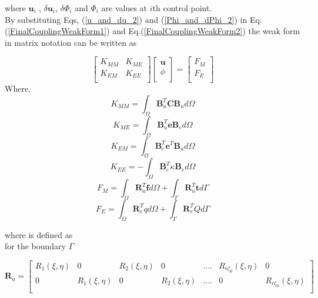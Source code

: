 \documentclass[12pt]{article}
\begin{document}
\noindent
where $\textbf{u}_i$ , $\delta\textbf{u}_i$, $\delta\Phi_i$ and $\Phi_i$ are values at $i$th control point.\\
By substituting Eqs, (\ref{u_and_du_2}) and (\ref{Phi_and_dPhi_2}) in Eq.(\ref{FinalCouplingWeakForm1}) and Eq.(\ref{FinalCouplingWeakForm2}) the weak form in matrix notation can be written as

\begin{equation} \label{CoupledStiffnessMatrix}
\begin{bmatrix} 
K_{MM} & K_{ME} \\
K_{EM} & K_{EE} \\ 
\end{bmatrix}
\begin{bmatrix} 
\textbf{u} \\
\phi \\ 
\end{bmatrix} = \begin{bmatrix} 
F_M \\
F_E \\ 
\end{bmatrix}
\end{equation}  
Where,
\begin{equation}
K_{MM} = \int_\Omega \textbf{B}_u^T \textbf{C} \textbf{B}_u d\Omega
\end{equation}
\begin{equation}
K_{ME} = \int_\Omega \textbf{B}_u^T \textbf{e} \textbf{B}_e d\Omega
\end{equation}
\begin{equation}
K_{EM} = \int_\Omega \textbf{B}_e^T \textbf{e}^T \textbf{B}_u d\Omega
\end{equation}
\begin{equation}
K_{EE} = - \int_\Omega \textbf{B}_e^T \kappa \textbf{B}_e d\Omega
\end{equation}
\begin{equation}
F_M = \int_\Omega \textbf{R}_u^T \textbf{f} d\Omega + \int_\Gamma \textbf{R}_u^T \textbf{t} d\Gamma 
\end{equation}
\begin{equation}
F_E = \int_\Omega \textbf{R}_e^T q d\Omega + \int_\Gamma \textbf{R}_e^T Q d\Gamma 
\end{equation}

\noindent
where  is defined as \\
for the boundary $\Gamma$ 

\begin{equation} \label{RMatrix1}
\textbf{R}_u =
\begin{bmatrix}
R_1(\xi,\eta) & 0 & R_2(\xi,\eta) &0 & .... & R_{n_{cp}^e}(\xi,\eta) & 0 \\
0 &R_1(\xi,\eta) & 0 & R_2(\xi,\eta) & .... & 0 & R_{n_{cp}^e}(\xi,\eta) \\
\end{bmatrix}
\end{equation}
\end{document}
